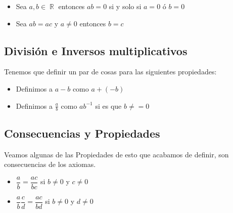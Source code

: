 \documentclass[12pt, fleqn]{report}                             %
\newenvironment{SmallIndentation}[1][0.75em]                    %
        {\begin{adjustwidth}{#1}{}\begin{footnotesize}}             %
        {\end{footnotesize}\end{adjustwidth}}                       %
\theoremstyle{break}                                            %
\DeclareMathOperator \Reals        {\mathbb{R}}                 %
\begin{document}
\begin{itemize}
\begin{SmallIndentation}[1em]
                            Este es sencillo, lo que nos dice es que 
                            $0 + 0 = 0$ lo cual es obvio por como funciona el
                            cero                        
                        \end{SmallIndentation}

                    \item Sea $a, b \in \Reals$ entonces $ab = 0$ si y solo si $a=0$ ó $b=0$

                    \item Sea $ab = ac$ y $a \neq 0$ entonces $b = c$

                 \end{itemize}

            
            \clearpage
            \subsection{División e Inversos multiplicativos}

                Tenemos que definir un par de cosas para las siguientes propiedades:

                \begin{itemize}
                    \item Definimos a $a - b$ como $a + (-b)$
                    \item Definimos a $\frac{a}{b}$ como $ab^{-1}$ si es que $b \neq = 0$
                \end{itemize}



            \subsection{Consecuencias y Propiedades}

                Veamos algunas de las Propiedades de esto que acabamos de definir, son consecuencias de los 
                axiomas.

                \begin{itemize}
                    \item $\dfrac{a}{b} = \dfrac{ac}{bc}$ si $b \neq 0$ y $c \neq 0$
                    \item $\dfrac{a}{b} \dfrac{c}{d} = \dfrac{ac}{bd}$ si $b \neq 0$ y $d \neq 0$
                \end{itemize}
\end{document}
